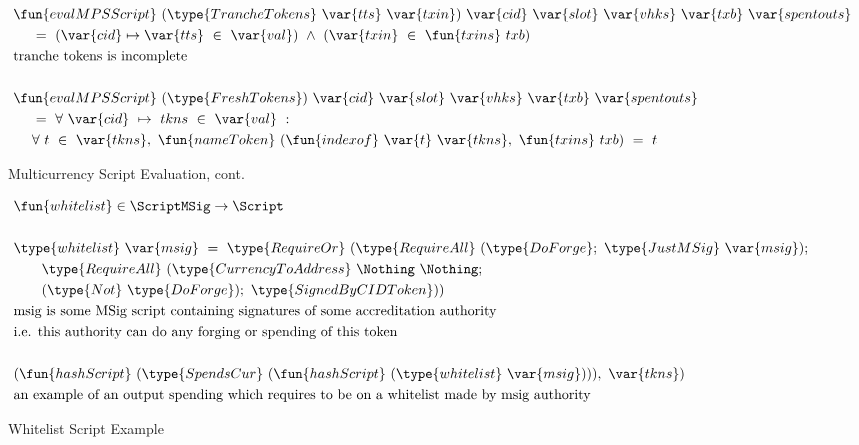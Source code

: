 \begin{figure*}[htb]
  \begin{align*}
    & \fun{evalMPSScript}
     ~(\type{TrancheTokens}~\var{tts}~\var{txin})~\var{cid}~\var{slot}~\var{vhks}
     ~\var{txb}~\var{spentouts}  \\
    &~~~~ =~(\var{cid}\mapsto\var{tts}~\in~\var{val})~ \wedge~(\var{txin}~\in~\fun{txins}~{txb}) \\
    & \text{tranche tokens is incomplete} \\~\\
    & \fun{evalMPSScript}
     ~(\type{FreshTokens})~\var{cid}~\var{slot}~\var{vhks}
     ~\var{txb}~\var{spentouts}
      \\
    &~~~~ =~\forall~\var{cid}~ \mapsto ~tkns ~\in~ \var{val}~:~ \\
    &~~~~ \forall~t~\in~\var{tkns},~
        \fun{nameToken}~(\fun{indexof}~\var{t}~\var{tkns},~\fun{txins}~{txb})~=~t
    \end{align*}
    \caption{Multicurrency Script Evaluation, cont.}
    \label{fig:defs:tx-mc-eval-3}
\end{figure*}

\begin{figure*}[htb]
  \begin{align*}
    & \fun{whitelist} \in\ScriptMSig\to\Script  \\~\\
    & \type{whitelist}  ~\var{msig}~ =~ \type{RequireOr}~
    (\type{RequireAll}~(\type{DoForge};~\type{JustMSig}~\var{msig});~\\
    &~~~~~~ \type{RequireAll}~(\type{CurrencyToAddress}~\Nothing~\Nothing ;\\
    &~~~~~~ (\type{Not}~\type{DoForge});~\type{SignedByCIDToken})) \\
    & \text{msig is some MSig script containing signatures of some accreditation authority} \\
    & \text{i.e. this authority can do any forging or spending of this token} \\~\\
    & (\fun{hashScript}~(\type{SpendsCur}~(\fun{hashScript}~(\type{whitelist}~\var{msig}))),~ \var{tkns}) \\
    & \text{an example of an output spending which requires to be on a whitelist made by msig authority}
  \end{align*}
  \caption{Whitelist Script Example}
  \label{fig:whitelist-example}
\end{figure*}



